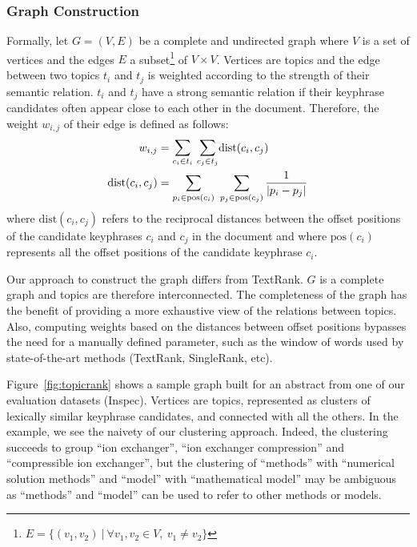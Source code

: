     \subsubsection{Graph Construction}
    \label{subsubsec:graph_construction}
      Formally, let $G = (V, E)$ be a complete and undirected graph where $V$ is
      a set of vertices and the edges $E$ a
      subset\footnote{$E = \{(v_1, v_2)\ |\ \forall v_1, v_2 \in V,\ v_1 \neq v_2\}$}
      of $V \times V$. Vertices are topics and the edge between two topics $t_i$
      and $t_j$ is weighted according to the strength of their semantic
      relation. $t_i$ and $t_j$ have a strong semantic relation if their
      keyphrase candidates often appear close to each other in the document.
      Therefore, the weight $w_{i, j}$ of their edge is defined as follows:
      \begin{align}
        w_{i, j} &= \mathlarger{\sum}_{c_i \in t_i}\ \mathlarger{\sum}_{c_j \in t_j} \text{dist}(c_i, c_j) \label{math:semantic_relatedness}\\
        \text{dist}(c_i, c_j) &= \sum_{p_i \in \text{pos}(c_i)}\ \sum_{p_j \in \text{pos}(c_j)} \frac{1}{|p_i - p_j|} \label{math:distance}
      \end{align}
      where $\text{dist}(c_i, c_j)$ refers to the reciprocal distances between
      the offset positions of the candidate keyphrases $c_i$ and $c_j$ in the
      document and where $\text{pos}(c_i)$ represents all the offset positions
      of the candidate keyphrase $c_i$.

      Our approach to construct the graph differs from TextRank. $G$ is a
      complete graph and topics are therefore interconnected. The completeness
      of the graph has the benefit of providing a more exhaustive view of the
      relations between topics. Also, computing weights based on the distances
      between offset positions bypasses the need for a manually defined
      parameter, such as the window of words used by state-of-the-art methods
      (TextRank, SingleRank, etc).

      Figure~\ref{fig:topicrank} shows a sample graph built for an abstract from
      one of our evaluation datasets (Inspec). Vertices are topics, represented
      as clusters of lexically similar keyphrase candidates, and connected with
      all the others. In the example, we see the naivety of our clustering
      approach. Indeed, the clustering succeeds to group ``ion exchanger'',
      ``ion exchanger compression'' and ``compressible ion exchanger'', but the
      clustering of ``methods'' with ``numerical solution methods'' and
      ``model'' with ``mathematical model'' may be ambiguous as ``methods'' and
      ``model'' can be used to refer to other methods or models.

